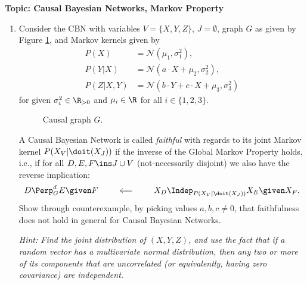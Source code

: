

\flushleft\textbf{Topic: Causal Bayesian Networks, Markov Property}
\begin{enumerate}

  \item %
  Consider the CBN with variables $V=\{X, Y, Z\}$, $J=\emptyset$, graph $G$ as given by Figure \ref{fig:one}, and Markov kernels given by
  \begin{align*}
    P(X)      & = \mathcal{N}(\mu_1, \sigma^2_1),                      \\
    P(Y|X)    & = \mathcal{N}(a\cdot X + \mu_2, \sigma^2_2),           \\
    P(Z|X, Y) & = \mathcal{N}(b\cdot Y + c\cdot X + \mu_3, \sigma^2_3)
  \end{align*}
  for given $\sigma_i^2\in\R_{>0}$ and $\mu_i\in\R$ for all $i\in\{1, 2, 3\}$.

  \begin{figure}[ht]
    \centering
    \caption{Causal graph $G$.}
    \label{fig:one}
  \end{figure}

  A Causal Bayesian Network is called \emph{faithful} with regards to its joint Markov kernel $P(X_V|\doit(X_J))$ if the inverse of the Global Markov Property holds, i.e., if for all $D, E, F \ins J \cup V$ (not-necessarily disjoint) we also have the reverse implication:
  \[ D \Perp^d_G E \given F \qquad \impliedby \qquad X_D \Indep_{P(X_V|\doit(X_J))} X_E \given X_F. \]
  Show through counterexample, by picking values $a, b, c \neq 0$, that faithfulness does not hold in general for Causal Bayesian Networks.

  \emph{Hint: Find the joint distribution of $(X, Y, Z)$, and use the fact that if a random vector has a multivariate normal distribution, then any two or more of its components that are uncorrelated (or equivalently, having zero covariance) are independent.}


\end{enumerate}

